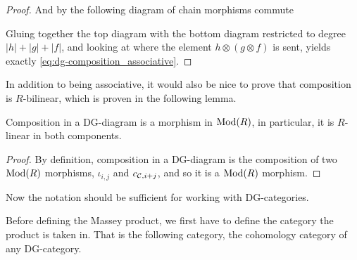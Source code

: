 \begin{proof}
    And by \cite[Definition 6.2.1]{Borceux_1994} the following diagram of chain morphisms commute
    \begin{center}
    \end{center}
    Gluing together the top diagram with the bottom diagram restricted to degree \( |h| + |g| + |f| \), and looking at where the element \( h \otimes (g \otimes f) \) is sent, yields exactly \autoref{eq:dg-composition_associative}.
\end{proof}

In addition to being associative, it would also be nice to prove that composition is \( R \)-bilinear, which is proven in the following lemma.

\begin{lemma}
    Composition in a DG-diagram is a morphism in \( \operatorname{Mod}(R) \), in particular, it is \( R \)-linear in both components.
\end{lemma}
\begin{proof}
    By definition, composition in a DG-diagram is the composition of two \( \operatorname{Mod}(R) \) morphisms, \( \iota_{i, j} \) and \( c_{{\mathcal{C}}, i + j} \), and so it is a \( \operatorname{Mod}(R) \) morphism.
\end{proof}

Now the notation should be sufficient for working with DG-categories.

Before defining the Massey product, we first have to define the category the product is taken in. That is the following category, the cohomology category of any DG-category.

